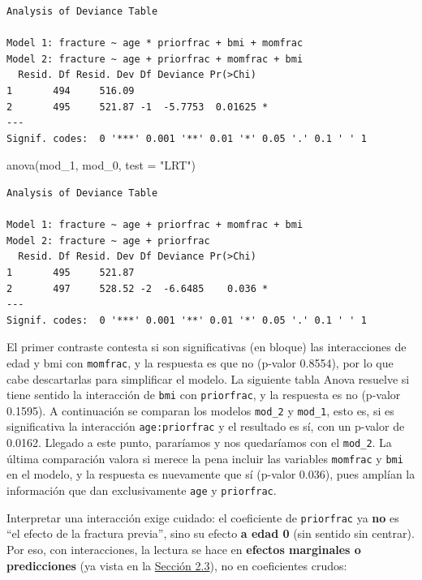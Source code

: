 \documentclass[
  letterpaper,
  DIV=11,
  numbers=noendperiod]{scrartcl}
\newenvironment{Shaded}{\begin{snugshade}}{\end{snugshade}}
\newcommand{\AttributeTok}[1]{\textcolor[rgb]{0.40,0.45,0.13}{#1}}
\newcommand{\FunctionTok}[1]{\textcolor[rgb]{0.28,0.35,0.67}{#1}}
\newcommand{\NormalTok}[1]{\textcolor[rgb]{0.00,0.23,0.31}{#1}}
\newcommand{\StringTok}[1]{\textcolor[rgb]{0.13,0.47,0.30}{#1}}
\begin{document}
\begin{verbatim}
Analysis of Deviance Table

Model 1: fracture ~ age * priorfrac + bmi + momfrac
Model 2: fracture ~ age + priorfrac + momfrac + bmi
  Resid. Df Resid. Dev Df Deviance Pr(>Chi)  
1       494     516.09                       
2       495     521.87 -1  -5.7753  0.01625 *
---
Signif. codes:  0 '***' 0.001 '**' 0.01 '*' 0.05 '.' 0.1 ' ' 1
\end{verbatim}

\begin{Shaded}
\begin{Highlighting}[]
\FunctionTok{anova}\NormalTok{(mod\_1, mod\_0, }\AttributeTok{test =} \StringTok{"LRT"}\NormalTok{) }
\end{Highlighting}
\end{Shaded}

\begin{verbatim}
Analysis of Deviance Table

Model 1: fracture ~ age + priorfrac + momfrac + bmi
Model 2: fracture ~ age + priorfrac
  Resid. Df Resid. Dev Df Deviance Pr(>Chi)  
1       495     521.87                       
2       497     528.52 -2  -6.6485    0.036 *
---
Signif. codes:  0 '***' 0.001 '**' 0.01 '*' 0.05 '.' 0.1 ' ' 1
\end{verbatim}

El primer contraste contesta si son significativas (en bloque) las
interacciones de edad y bmi con \texttt{momfrac}, y la respuesta es que
no (p-valor 0.8554), por lo que cabe descartarlas para simplificar el
modelo. La siguiente tabla Anova resuelve si tiene sentido la
interacción de \texttt{bmi} con \texttt{priorfrac}, y la respuesta es no
(p-valor 0.1595). A continuación se comparan los modelos \texttt{mod\_2}
y \texttt{mod\_1}, esto es, si es significativa la interacción
\texttt{age:priorfrac} y el resultado es sí, con un p-valor de 0.0162.
Llegado a este punto, pararíamos y nos quedaríamos con el
\texttt{mod\_2}. La última comparación valora si merece la pena incluir
las variables \texttt{momfrac} y \texttt{bmi} en el modelo, y la
respuesta es nuevamente que sí (p-valor 0.036), pues amplían la
información que dan exclusivamente \texttt{age} y \texttt{priorfrac}.

Interpretar una interacción exige cuidado: el coeficiente de
\texttt{priorfrac} ya \textbf{no} es ``el efecto de la fractura
previa'', sino su efecto \textbf{a edad 0} (sin sentido sin centrar).
Por eso, con interacciones, la lectura se hace en \textbf{efectos
marginales o predicciones} (ya vista en la
\protect\hyperlink{sec-u12-interpretacion}{Sección 2.3}), no en
coeficientes crudos:
\end{document}

